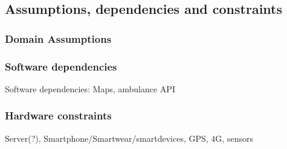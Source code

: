 \subsection{Assumptions, dependencies and constraints}
\subsubsection{Domain Assumptions}
\subsubsection{Software dependencies}
Software dependencies: Maps, ambulance API
\subsubsection{Hardware constraints}
Server(?), Smartphone/Smartwear/smartdevices, GPS, 4G, sensors